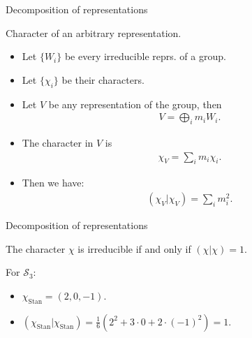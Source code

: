 \documentclass[10pt]{beamer}
\newcommand{\Sym}{\mathcal{S}}
\newcommand{\Stan}{\text{Stan}}
\begin{document}
	\begin{frame}{Decomposition of representations}
		\begin{block}{Character of an arbitrary representation.}
			\begin{itemize}
				
				\item Let $\{W_i\}$ be every irreducible reprs. of a group.
				
				\item Let $\{\chi_i\}$ be their characters.\pause
				
				\item Let $V$ be any representation of the group, then \begin{align*}
					V = \bigoplus_i m_i W_i.
				\end{align*}
				
				\item The character in $V$ is \begin{align*}
					\chi_V = \sum_i m_i \chi_i.
				\end{align*}\pause
  				
				\item Then we have: \begin{align*}
					(\chi_V|\chi_V) = \sum_i m_i^2.
				\end{align*}
			\end{itemize}
		\end{block}
	\end{frame}
	
	\begin{frame}{Decomposition of representations}
		\begin{theorem}
			The character $\chi$ is irreducible if and only if $(\chi|\chi) = 1$.
		\end{theorem}\pause
		
		\begin{example}
			For $\Sym_3$: 
			\begin{itemize}
				\item $\chi_\Stan = (2,0,-1)$.
				\item $(\chi_\Stan|\chi_\Stan) = \frac{1}{6}\left(2^2 + 3 \cdot 0 + 2 \cdot (-1)^2\right) = 1$.
			\end{itemize}
		\end{example}
		
	\end{frame}	
%			
%			
	
\end{document}
